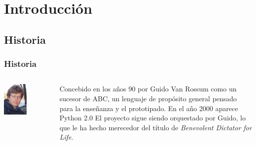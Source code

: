 \documentclass{beamer}
\begin{document}
\section{Introducción} %

\subsection{Historia} %

\begin{frame}
\frametitle{Historia}
\begin{columns}[T]
\begin{column}{.5\textwidth}
\includegraphics[width=0.5\textwidth]{guido.jpg}
\end{column}
\begin{column}{.5\textwidth}
Concebido en los años 90 por Guido Van Rossum como un sucesor de ABC, un lenguaje de propósito general pensado para la enseñanza y el prototipado.
En el año 2000 aparece Python 2.0
El proyecto sigue siendo orquestado por Guido, lo que le ha hecho merecedor del título de \textit{Benevolent Dictator for Life}.
\end{column}
\end{columns}
\end{frame}
\end{document}
